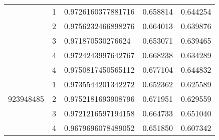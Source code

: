 \begin{table}[h!]
\begin{tabular}{|l|l|l|l|l|}
                           & 1    & 0.9726160377881716 & 0.658814  & 0.644254   \\ \cline{2-5} 
                           & 2    & 0.9756232466898276 & 0.664013  & 0.639876   \\ \cline{2-5} 
                           & 3    & 0.971870530276624  & 0.653071  & 0.639465   \\ \cline{2-5} 
                           & 4    & 0.9724243997642767 & 0.668238  & 0.634289   \\ \hline
\multirow{5}{*}{923948485} & 4    & 0.9750817450565112 & 0.677104  & 0.644832   \\ \cline{2-5} 
                           & 1    & 0.9735544201342272 & 0.652362  & 0.625589   \\ \cline{2-5} 
                           & 2    & 0.9752181693908796 & 0.671951  & 0.629559   \\ \cline{2-5} 
                           & 3    & 0.9721216597194158 & 0.664733  & 0.651040   \\ \cline{2-5} 
                           & 4    & 0.9679696078489052 & 0.651850  & 0.607342   \\ \hline
\end{tabular}
\label{tab:seed-stability-experiment-result}
\end{table}

